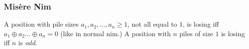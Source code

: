 \subsubsection{Mis\`{e}re Nim}
A position with pile sizes $a_1, a_2, \dots, a_n \ge 1$,
not all equal to $1$, is losing iff $a_1 \oplus a_2 \dots \oplus a_n = 0$
(like in normal nim.)
A position with $n$ piles of size $1$ is losing iff $n$ is \emph{odd}.


